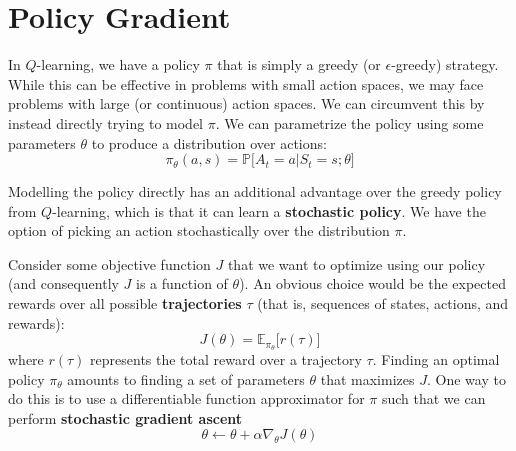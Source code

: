 \documentclass[journal, onecolumn, 12pt, draftclsnofoot]{IEEEtran}
\numberwithin{equation}{section}
\newcommand{\kword}[1]{\textbf{#1}}
\begin{document}
		\section{Policy Gradient}
		\par In $Q$-learning, we have a policy $\pi$ that is simply a greedy (or $\epsilon$-greedy) strategy. While this can be effective in problems with small action spaces, we may face problems with large (or continuous) action spaces. We can circumvent this by instead directly trying to model $\pi$. We can parametrize the policy using some parameters $\theta$ to produce a distribution over actions:
		\begin{equation}
			\label{eqn:policy-as-distribution}
			\pi_\theta(a, s) = \mathbb{P}\big[ A_t=a \vert S_t = s; \theta \big]
		\end{equation}
		\par Modelling the policy directly has an additional advantage over the greedy policy from $Q$-learning, which is that it can learn a \kword{stochastic policy}. We have the option of picking an action stochastically over the distribution $\pi$.
		\par Consider some objective function $J$ that we want to optimize using our policy (and consequently $J$ is a function of $\theta$). An obvious choice would be the expected rewards over all possible \kword{trajectories} $\tau$ (that is, sequences of states, actions, and rewards):
		\begin{equation}
			\label{eqn:j-expectation}
			J(\theta) = \mathbb{E}_{\pi_\theta} \big[ r(\tau) \big]
		\end{equation}
		where $r(\tau)$ represents the total reward over a trajectory $\tau$. Finding an optimal policy $\pi_\theta$ amounts to finding a set of parameters $\theta$ that maximizes $J$. One way to do this is to use a differentiable function approximator for $\pi$ such that we can perform \kword{stochastic gradient ascent}
		\begin{equation}
			\label{eqn:j-SGA}
			\theta \gets \theta + \alpha \nabla_\theta J(\theta)
		\end{equation}
\end{document}

